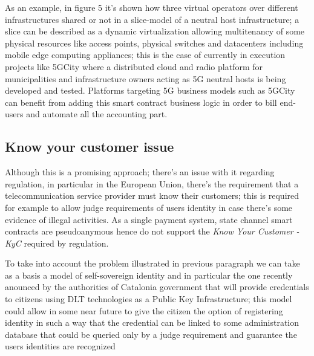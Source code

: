 \documentclass[12pt]{amsart}
\begin{document}
\begin{multicols}{2}

As an example, in figure 5 it's shown how three virtual operators over
different infrastructures shared or not in a slice-model of a neutral host
infrastructure; a slice can be described as a dynamic virtualization
allowing multitenancy of some physical resources like access points,
physical switches and datacenters including mobile edge computing
appliances; this is the case of currently in execution projects like
5GCity\cite{5gcity} where a distributed cloud
and radio platform for municipalities and infrastructure owners acting
as 5G neutral hosts is being developed and tested. Platforms
targeting 5G business models such as 5GCity can benefit from adding
this smart contract business logic in order to bill end-users and automate
all the accounting part.

\subsection{Know your customer issue}

\vspace{0.35cm}

Although this is a promising approach; there's an issue with it regarding
regulation, in particular in the European Union, there's the requirement
that a telecommunication service provider must know their customers; this
is required for example to allow judge requirements of users identity
in case there's some evidence of illegal activities. As a single payment
system, state channel smart contracts are pseudoanymous hence do not
support the \textit{Know Your Customer - KyC} required by regulation.

\vspace{0.35cm}

To take into account the problem illustrated in previous paragraph
we can take as a basis a model of self-sovereign identity\cite{allen}
and in particular the one recently anounced by the authorities
of Catalonia government\cite{identicat} that will provide credentials
to citizens using DLT technologies as a Public Key Infrastructure; this
model could allow in some near future to give the citizen the option
of registering identity in such a way that the credential can be linked
to some administration database that could be queried only by a judge
requirement and guarantee the users identities are recognized



\end{multicols}
\end{document}
